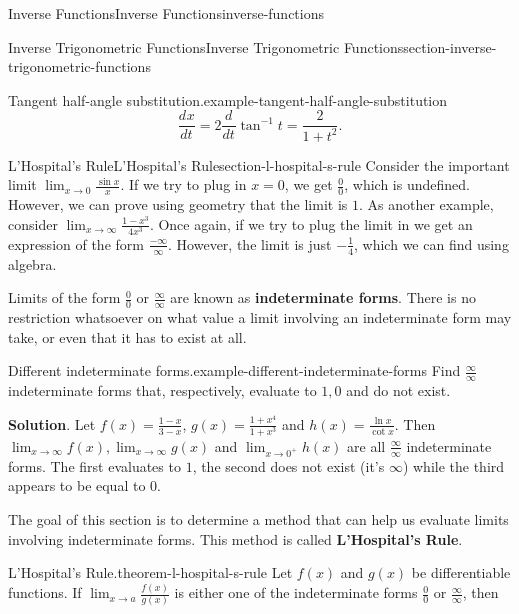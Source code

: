 \documentclass[oneside,10pt,]{book}
\newcommand{\terminology}[1]{\textbf{#1}}
\numberwithin{equation}{section}
\newcommand{\dv}[3][]{\dfrac{d^{#1} #2}{d #3^{#1}}}
\begin{document}
\begin{chapterptx}{Inverse Functions}{}{Inverse Functions}{}{}{inverse-functions}
\begin{sectionptx}{Inverse Trigonometric Functions}{}{Inverse Trigonometric Functions}{}{}{section-inverse-trigonometric-functions}
\begin{example}{Tangent half-angle substitution.}{example-tangent-half-angle-substitution}
\begin{equation*}
\dv{x}{t} = 2\dv{}{t}\tan^{-1}t = \frac{2}{1+t^{2}}.
\end{equation*}
%
\end{example}
\end{sectionptx}
%
%
\typeout{************************************************}
\typeout{************************************************}
%
\begin{sectionptx}{L'Hospital's Rule}{}{L'Hospital's Rule}{}{}{section-l-hospital-s-rule}
\hypertarget{p-282}{}%
Consider the important limit \(\lim_{x\to0}\frac{\sin x}{x}\). If we try to plug in \(x=0\), we get \(\frac{0}{0}\), which is undefined. However, we can prove using geometry that the limit is \(1\). As another example, consider \(\lim_{x\to\infty}\frac{1-x^{3}}{4x^{3}}\). Once again, if we try to plug the limit in we get an expression of the form \(\frac{-\infty}{\infty}\). However, the limit is just \(-\frac{1}{4}\), which we can find using algebra.%
\par
\hypertarget{p-283}{}%
Limits of the form \(\frac{0}{0}\) or \(\frac{\infty}{\infty}\) are known as \terminology{indeterminate forms}. There is no restriction whatsoever on what value a limit involving an indeterminate form may take, or even that it has to exist at all.%
\begin{example}{Different indeterminate forms.}{example-different-indeterminate-forms}%
\hypertarget{p-284}{}%
Find \(\frac{\infty}{\infty}\) indeterminate forms that, respectively, evaluate to \(1, 0\) and do not exist.%
\par\smallskip%
\noindent\textbf{Solution}.\hypertarget{solution-62}{}\quad%
\hypertarget{p-285}{}%
Let \(f(x) = \frac{1-x}{3-x}\), \(g(x) = \frac{1+x^{4}}{1+x^{3}}\) and \(h(x) = \frac{\ln x}{\cot x}\). Then \(\lim_{x\to\infty}f(x), \lim_{x\to\infty}g(x)\) and \(\lim_{x\to0^{+}}h(x)\) are all \(\frac{\infty}{\infty}\) indeterminate forms. The first evaluates to \(1\), the second does not exist (it's \(\infty\)) while the third appears to be equal to \(0\).%
\end{example}
\hypertarget{p-286}{}%
The goal of this section is to determine a method that can help us evaluate limits involving indeterminate forms. This method is called \terminology{L'Hospital's Rule}.%
\begin{theorem}{L'Hospital's Rule.}{}{theorem-l-hospital-s-rule}%
\hypertarget{p-287}{}%
Let \(f(x)\) and \(g(x)\) be differentiable functions. If \(\lim_{x\to a}\frac{f(x)}{g(x)}\) is either one of the indeterminate forms \(\frac{0}{0}\) or \(\frac{\infty}{\infty}\), then%

\end{theorem}
\end{sectionptx}
\end{chapterptx}
\end{document}
